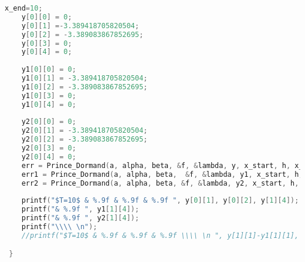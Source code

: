 \documentclass{article}
\theoremstyle{remark}
\theoremstyle{definition}
\begin{document}
\begin{lstlisting}[language=C]
    x_end=10;
    y[0][0] = 0;
    y[0][1] =-3.389418705820504;
    y[0][2] = -3.389083867852695;
    y[0][3] = 0;
    y[0][4] = 0;
    
    y1[0][0] = 0;
    y1[0][1] = -3.389418705820504;
    y1[0][2] = -3.389083867852695;
    y1[0][3] = 0;
    y1[0][4] = 0;
    
    y2[0][0] = 0;
    y2[0][1] = -3.389418705820504;
    y2[0][2] = -3.389083867852695;
    y2[0][3] = 0;
    y2[0][4] = 0;
    err = Prince_Dormand(a, alpha, beta, &f, &lambda, y, x_start, h, x_end, &h_next, eps); 
    err1 = Prince_Dormand(a, alpha, beta,  &f, &lambda, y1, x_start, h, x_end, &h_next, eps*1e-2);
    err2 = Prince_Dormand(a, alpha, beta, &f, &lambda, y2, x_start, h, x_end, &h_next, eps*1e-4);
    
    printf("$T=10$ & %.9f & %.9f & %.9f ", y[0][1], y[0][2], y[1][4]);
    printf("& %.9f ", y1[1][4]);
    printf("& %.9f ", y2[1][4]);
    printf("\\\\ \n");
    //printf("$T=10$ & %.9f & %.9f & %.9f \\\\ \n ", y[1][1]-y1[1][1], y1[1][1]-y2[1][1], (y[1][1]-y1[1][1])/(y1[1][1]-y2[1][1]));

 }

	\end{lstlisting}
\end{document}
